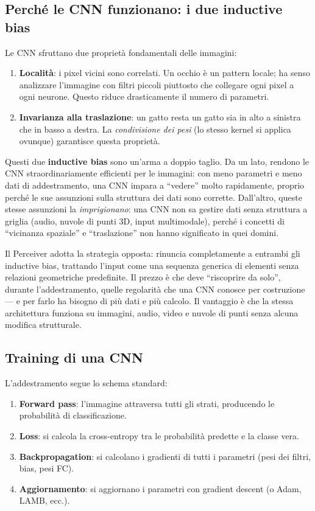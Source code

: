 \documentclass[12pt,a4paper]{article}
\begin{document}
\subsection{Perch\'e le CNN funzionano: i due inductive bias}

Le CNN sfruttano due propriet\`a fondamentali delle immagini:

\begin{enumerate}
    \item \textbf{Localit\`a}: i pixel vicini sono correlati. Un occhio \`e un pattern locale; ha senso analizzare l'immagine con filtri piccoli piuttosto che collegare ogni pixel a ogni neurone. Questo riduce drasticamente il numero di parametri.
    \item \textbf{Invarianza alla traslazione}: un gatto resta un gatto sia in alto a sinistra che in basso a destra. La \emph{condivisione dei pesi} (lo stesso kernel si applica ovunque) garantisce questa propriet\`a.
\end{enumerate}

Questi due \textbf{inductive bias} sono un'arma a doppio taglio. Da un lato, rendono le CNN straordinariamente efficienti per le immagini: con meno parametri e meno dati di addestramento, una CNN impara a ``vedere'' molto rapidamente, proprio perch\'e le sue assunzioni sulla struttura dei dati sono corrette. Dall'altro, queste stesse assunzioni la \emph{imprigionano}: una CNN non sa gestire dati senza struttura a griglia (audio, nuvole di punti 3D, input multimodale), perch\'e i concetti di ``vicinanza spaziale'' e ``traslazione'' non hanno significato in quei domini.

Il Perceiver adotta la strategia opposta: rinuncia completamente a entrambi gli inductive bias, trattando l'input come una sequenza generica di elementi senza relazioni geometriche predefinite. Il prezzo \`e che deve ``riscoprire da solo'', durante l'addestramento, quelle regolarit\`a che una CNN conosce per costruzione --- e per farlo ha bisogno di pi\`u dati e pi\`u calcolo. Il vantaggio \`e che la stessa architettura funziona su immagini, audio, video e nuvole di punti senza alcuna modifica strutturale.


\subsection{Training di una CNN}

L'addestramento segue lo schema standard:
\begin{enumerate}
    \item \textbf{Forward pass}: l'immagine attraversa tutti gli strati, producendo le probabilit\`a di classificazione.
    \item \textbf{Loss}: si calcola la cross-entropy tra le probabilit\`a predette e la classe vera.
    \item \textbf{Backpropagation}: si calcolano i gradienti di tutti i parametri (pesi dei filtri, bias, pesi FC).
    \item \textbf{Aggiornamento}: si aggiornano i parametri con gradient descent (o Adam, LAMB, ecc.).
\end{enumerate}
\end{document}
